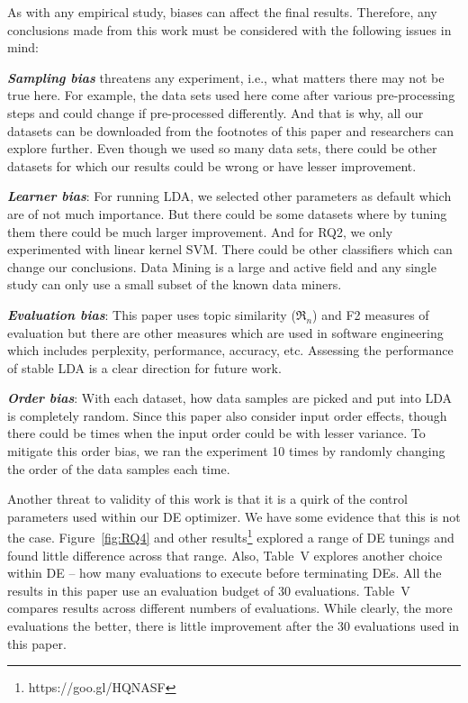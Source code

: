 \documentclass[twocolumn,5p,sort&compress]{elsarticle}
\theoremstyle{break}
\begin{document}
As with any empirical study, biases can affect the final
results. Therefore, any conclusions made from this work must be considered with the following issues in mind:

\textbf{\textit{Sampling bias}} threatens any experiment, i.e., what matters there may not be true here. For example,
the data sets used here come after various pre-processing steps and could change if pre-processed differently. And that is why, all our datasets can be downloaded from the footnotes of this paper and researchers can explore further. Even though we used so many data sets, there could be other datasets for which our results could be wrong or have lesser improvement.

\textbf{\textit{Learner bias}}: For running LDA, we selected other parameters as default which are of not much importance. But there could be some datasets where by tuning them there could be much larger improvement. And for RQ2, we only experimented with linear kernel SVM. There could be other classifiers which can change our conclusions. Data Mining is a large and active field and any single study can only use a small subset of the known data miners.

\textbf{\textit{Evaluation bias}}: This paper uses topic similarity ($\Re_n$) and F2 measures of evaluation but there are other measures which are used in software engineering which
includes perplexity, performance, accuracy, etc. Assessing
the performance of stable LDA is a clear direction for future work.

\textbf{\textit{Order bias}}: With each dataset, how data samples are picked and put into LDA is completely random. Since this paper also consider input order effects, though there could be times when the input order could be with lesser variance. To mitigate this order bias, we ran the experiment 10 times by randomly changing the order of the data samples each time.


Another threat to validity of this work is that it is a quirk of the control
parameters used within our DE optimizer.
We have some evidence that this is not the case.
Figure~\ref{fig:RQ4} and other results\footnote{https://goo.gl/HQNASF} explored a range of DE tunings and found
little difference across that range. Also, Table~V explores another choice within DE -- how
many evaluations to execute before terminating DEs. All the results in this paper use an
evaluation budget of 30 evaluations. Table~V
compares results across different numbers of evaluations. While clearly,
the more evaluations the better, there is little improvement after the
30 evaluations used in this paper.
\end{document}
